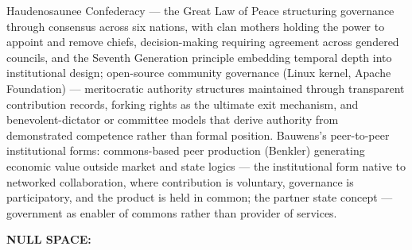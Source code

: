 Haudenosaunee Confederacy — the Great Law of Peace structuring governance through consensus across six nations, with clan mothers holding the power to appoint and remove chiefs, decision-making requiring agreement across gendered councils, and the Seventh Generation principle embedding temporal depth into institutional design; open-source community governance (Linux kernel, Apache Foundation) — meritocratic authority structures maintained through transparent contribution records, forking rights as the ultimate exit mechanism, and benevolent-dictator or committee models that derive authority from demonstrated competence rather than formal position. Bauwens's peer-to-peer institutional forms: commons-based peer production (Benkler) generating economic value outside market and state logics — the institutional form native to networked collaboration, where contribution is voluntary, governance is participatory, and the product is held in common; the partner state concept — government as enabler of commons rather than provider of services.


\textbf{NULL SPACE:}

